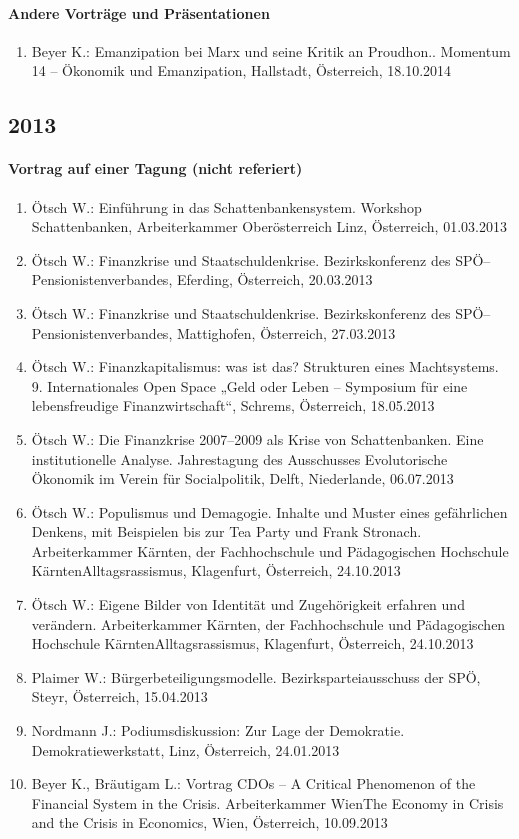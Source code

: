\paragraph{Andere Vorträge und Präsentationen}
\begin{enumerate}
	\item Beyer K.: Emanzipation bei Marx und seine Kritik an Proudhon.. Momentum 14 -- Ökonomik und Emanzipation, Hallstadt, Österreich, 18.10.2014
\end{enumerate}
\subsection*{2013}
\paragraph{Vortrag auf einer Tagung (nicht referiert)}
\begin{enumerate}
	\item Ötsch W.: Einführung in das Schattenbankensystem. Workshop Schattenbanken, Arbeiterkammer Oberösterreich Linz, Österreich, 01.03.2013
	\item Ötsch W.: Finanzkrise und Staatschuldenkrise. Bezirkskonferenz des SPÖ--Pensionistenverbandes, Eferding, Österreich, 20.03.2013
	\item Ötsch W.: Finanzkrise und Staatschuldenkrise. Bezirkskonferenz des SPÖ--Pensionistenverbandes, Mattighofen, Österreich, 27.03.2013
	\item Ötsch W.: Finanzkapitalismus: was ist das? Strukturen eines Machtsystems. 9. Internationales Open Space „Geld oder Leben – Symposium für eine lebensfreudige Finanzwirtschaft“, Schrems, Österreich, 18.05.2013
	\item Ötsch W.: Die Finanzkrise 2007--2009 als Krise von Schattenbanken. Eine institutionelle Analyse. Jahrestagung des Ausschusses Evolutorische Ökonomik im Verein für Socialpolitik, Delft, Niederlande, 06.07.2013
	\item Ötsch W.: Populismus und Demagogie. Inhalte und Muster eines gefährlichen Denkens, mit Beispielen bis zur Tea Party und Frank Stronach. Arbeiterkammer Kärnten, der Fachhochschule und Pädagogischen Hochschule KärntenAlltagsrassismus, Klagenfurt, Österreich, 24.10.2013
	\item Ötsch W.: Eigene Bilder von Identität und Zugehörigkeit erfahren und verändern. Arbeiterkammer Kärnten, der Fachhochschule und Pädagogischen Hochschule KärntenAlltagsrassismus, Klagenfurt, Österreich, 24.10.2013
	\item Plaimer W.: Bürgerbeteiligungsmodelle. Bezirksparteiausschuss der SPÖ, Steyr, Österreich, 15.04.2013
	\item Nordmann J.: Podiumsdiskussion: Zur Lage der Demokratie. Demokratiewerkstatt, Linz, Österreich, 24.01.2013
	\item Beyer K., Bräutigam L.: Vortrag CDOs -- A Critical Phenomenon of the Financial System in the Crisis. Arbeiterkammer WienThe Economy in Crisis and the Crisis in Economics, Wien, Österreich, 10.09.2013
\end{enumerate}
